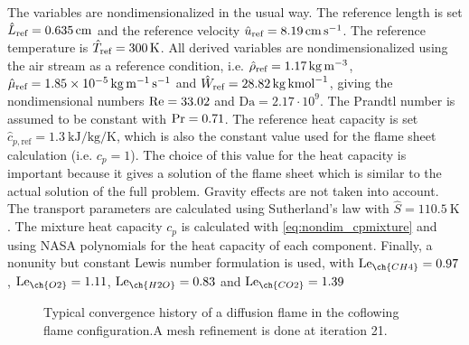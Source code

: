 The variables are nondimensionalized in the usual way. The reference length is set $\hat L_{\text{ref}} =  \SI{0.635}{\centi \meter}$ and the reference velocity $\hat u_{\text{ref}} =\SI{8.19}{\centi \meter \per \second}$. The reference temperature is $\hat T_{\text{ref}} =\SI{300}{K}$.  All derived variables are nondimensionalized using the air stream as a reference condition, i.e. $\hat \rho_{\text{ref}} = \SI{1.17}{\kilo \gram \per \cubic \meter}$, $\hat \mu_{\text{ref}} = \SI{1.85e-5}{\kilo \gram \per \meter \per \second}$ and $\hat W_{\text{ref}} = \SI{28.82}{\kilo \gram \per \kilo\mole}$, giving the nondimensional numbers $\text{Re} = 33.02$ and $\text{Da} = 2.17\cdot 10^9$. The Prandtl number is assumed to be constant with $\text{Pr} = 0.71$. The reference heat capacity is set $\hat{c}_{p,\text{ref}}= \SI{1.3}{\kilo \joule \per \kilo \gram \per \kelvin}$, which is also the constant value used for the flame sheet calculation (i.e. $c_p = 1$). The choice of this value for the heat capacity is important because it gives a solution of the flame sheet which is similar to the actual solution of the full problem. Gravity effects are not taken into account. The transport parameters are calculated using Sutherland's law with $\hat{S} = \SI{110.5}{\kelvin}$. The mixture heat capacity $c_p$ is calculated with \cref{eq:nondim_cpmixture} and using NASA polynomials for the heat capacity of each component. Finally, a nonunity but constant Lewis number formulation is used, with
$\Lewis_{\ch{CH4}} =  0.97 $ , $\Lewis_{\ch{O2}} = 1.11 $, $\Lewis_{\ch{H2O}} = 0.83 $ and $\Lewis_{\ch{CO2}} = 1.39 $ \parencite{smookePremixedNonpremixedTest1991}
\begin{figure}[b!]
	\centering
	\caption{Typical convergence history of a diffusion flame in the coflowing flame configuration.A mesh refinement is done at iteration 21. }
	\label{fig:CoFlow_ConvergenceStory}
\end{figure}
